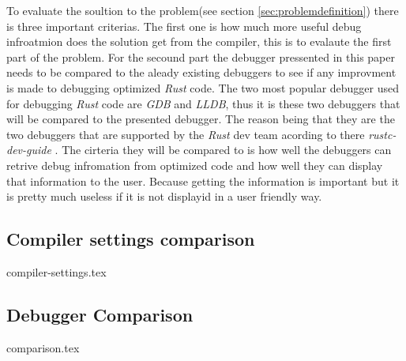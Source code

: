 

To evaluate the soultion to the problem(see section \ref{sec:problemdefinition}) there is three important criterias.
The first one is how much more useful debug infroatmion does the solution get from the compiler, this is to evalaute the first part of the problem. 
For the secound part the debugger pressented in this paper needs to be compared to the aleady existing debuggers to see if any improvment is made to debugging optimized \emph{Rust} code.
The two most popular debugger used for debugging \emph{Rust} code are \emph{GDB} and \emph{LLDB}, thus it is these two debuggers that will be compared to the presented debugger.
The reason being that they are the two debuggers that are supported by the \emph{Rust} dev team acording to there \emph{rustc-dev-guide} \cite{rust-dev-guide}.
The cirteria they will be compared to is how well the debuggers can retrive debug infromation from optimized code and how well they can display that information to the user.
Because getting the information is important but it is pretty much useless if it is not displayid in a user friendly way.


\subsection{Compiler settings comparison}
{compiler-settings.tex}


\subsection{Debugger Comparison}
{comparison.tex}

